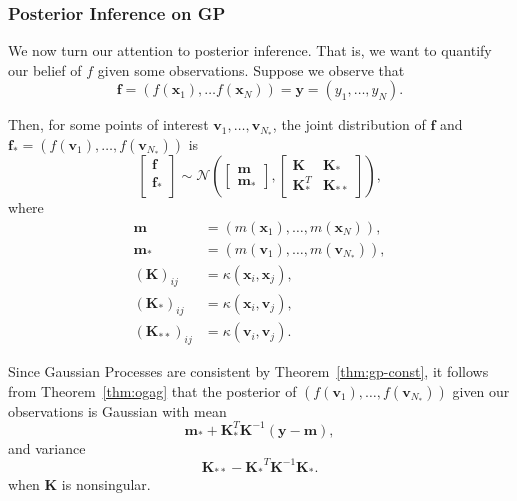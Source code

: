 \subsubsection{Posterior Inference on GP}

We now turn our attention to posterior inference.
That is, we want to quantify our belief of $f$ given some observations.
Suppose we observe that
\begin{equation*}
    \mathbf{f} = (f(\mathbf{x}_1), \dots f(\mathbf{x}_N)) = \mathbf{y} = (y_1, \dots, y_N).
\end{equation*}

Then, for some points of interest $\mathbf{v}_{1}, \dots, \mathbf{v}_{N_{*}}$, the joint distribution of $\mathbf{f}$ and $\mathbf{f}_* = (f(\mathbf{v}_1), \dots, f(\mathbf{v}_{N_*}))$ is
\begin{equation*}
    \begin{bmatrix}
        \mathbf{f} \\
        \mathbf{f}_{*} \\
    \end{bmatrix}
    \sim
    \mathcal{N}\left(
    \begin{bmatrix}
            \mathbf{m} \\
            \mathbf{m}_{*}
        \end{bmatrix}
    ,
    \begin{bmatrix}
            \mathbf{K} & \mathbf{K}_* \\
            \mathbf{K}_*^T & \mathbf{K}_{* *}
        \end{bmatrix}
    \right),
\end{equation*}
where
\begin{align*}
    \mathbf{m} & = (m(\mathbf{x}_1), \dots, m(\mathbf{x}_N)), \\
    \mathbf{m_*} & = (m(\mathbf{v}_1), \dots, m(\mathbf{v}_{N_{*}})), \\
    (\mathbf{K})_{ij} & = \kappa(\mathbf{x}_i, \mathbf{x}_j), \\
    (\mathbf{K}_*)_{ij} & = \kappa(\mathbf{x}_i, \mathbf{v}_j), \\
    (\mathbf{K}_{* *})_{ij} & = \kappa(\mathbf{v}_i, \mathbf{v}_j).
\end{align*}

Since Gaussian Processes are consistent by Theorem~\ref{thm:gp-const}, it follows from Theorem~\ref{thm:ogag} that the posterior
of $(f(\mathbf{v}_1), \dots, f(\mathbf{v}_{N_*}))$ given our observations is Gaussian with mean
\begin{equation}
    \label{eq:noisless-post-mean}
    \mathbf{m}_* + \mathbf{K}_*^T \mathbf{K}^{-1} (\mathbf{y} - \mathbf{m}),
\end{equation}
and variance
\begin{equation}
    \label{eq:noiseless-post-var}
    \mathbf{K}_{* *} - \mathbf{K_*}^{T} \mathbf{K}^{-1} \mathbf{K_*}.
\end{equation}
when $\mathbf{K}$ is nonsingular.

